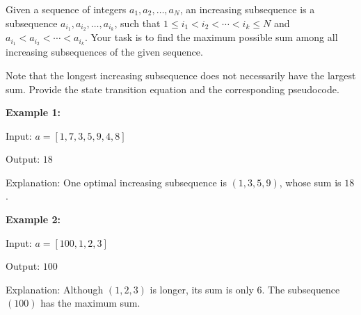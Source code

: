 \problem{}

Given a sequence of integers \(a_1, a_2, \dots, a_N\), an increasing subsequence is a subsequence \(a_{i_1}, a_{i_2}, \dots, a_{i_k}\), such that
\(1 \le i_1 < i_2 < \cdots < i_k \le N\) and \(a_{i_1} < a_{i_2} < \cdots < a_{i_k}.\) Your task is to find the maximum possible sum among all increasing subsequences of the given sequence.

Note that the longest increasing subsequence does not necessarily have the largest sum. Provide the state transition equation and the corresponding pseudocode.


\textbf{Example 1:}

Input: \(a = [1,7,3,5,9,4,8]\) 

Output: \(18\)

Explanation: One optimal increasing subsequence is \((1,3,5,9)\), whose sum is \(18\).

\textbf{Example 2:}

Input: \(a = [100,1,2,3]\)  

Output: \(100\)

Explanation: Although \((1,2,3)\) is longer, its sum is only \(6\). The subsequence \((100)\) has the maximum sum.

\solution{
}
\newpage